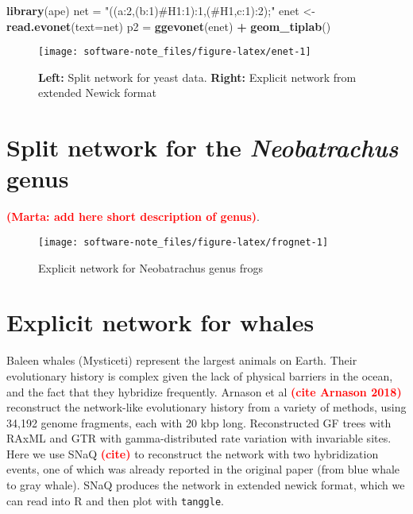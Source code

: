 \documentclass[]{article}
\newenvironment{Shaded}{\begin{snugshade}}{\end{snugshade}}
\newcommand{\DataTypeTok}[1]{\textcolor[rgb]{0.13,0.29,0.53}{#1}}
\newcommand{\KeywordTok}[1]{\textcolor[rgb]{0.13,0.29,0.53}{\textbf{#1}}}
\newcommand{\NormalTok}[1]{#1}
\newcommand{\OperatorTok}[1]{\textcolor[rgb]{0.81,0.36,0.00}{\textbf{#1}}}
\newcommand{\StringTok}[1]{\textcolor[rgb]{0.31,0.60,0.02}{#1}}
\begin{document}
\begin{Shaded}
\begin{Highlighting}[]
\KeywordTok{library}\NormalTok{(ape)}
\NormalTok{net =}\StringTok{ "((a:2,(b:1)#H1:1):1,(#H1,c:1):2);"}
\NormalTok{enet <-}\StringTok{ }\KeywordTok{read.evonet}\NormalTok{(}\DataTypeTok{text=}\NormalTok{net)}
\NormalTok{p2 =}\StringTok{ }\KeywordTok{ggevonet}\NormalTok{(enet) }\OperatorTok{+}\StringTok{ }\KeywordTok{geom_tiplab}\NormalTok{() }
\end{Highlighting}
\end{Shaded}

\begin{figure}[H]

{\centering \texttt{[image: software-note\_files/figure-latex/enet-1]} 

}

\caption{\textbf{Left:} Split network for yeast data. \textbf{Right:} Explicit network from extended Newick format}\label{fig:enet}
\end{figure}

\hypertarget{split-network-for-the-neobatrachus-genus}{%
\section{\texorpdfstring{Split network for the \emph{Neobatrachus}
genus}{Split network for the Neobatrachus genus}}\label{split-network-for-the-neobatrachus-genus}}

\textcolor{red}{\textbf{(Marta: add here short description of genus)}}.

\begin{figure}[H]

{\centering \texttt{[image: software-note\_files/figure-latex/frognet-1]} 

}

\caption{Explicit network for Neobatrachus genus frogs}\label{fig:frognet}
\end{figure}

\hypertarget{explicit-network-for-whales}{%
\section{Explicit network for
whales}\label{explicit-network-for-whales}}

Baleen whales (Mysticeti) represent the largest animals on Earth. Their
evolutionary history is complex given the lack of physical barriers in
the ocean, and the fact that they hybridize frequently. Arnason et al
\textcolor{red}{\textbf{(cite Arnason 2018)}} reconstruct the
network-like evolutionary history from a variety of methods, using
34,192 genome fragments, each with 20 kbp long. Reconstructed GF trees
with RAxML and GTR with gamma-distributed rate variation with invariable
sites. Here we use SNaQ \textcolor{red}{\textbf{(cite)}} to reconstruct
the network with two hybridization events, one of which was already
reported in the original paper (from blue whale to gray whale). SNaQ
produces the network in extended newick format, which we can read into R
and then plot with \texttt{tanggle}.
\end{document}

